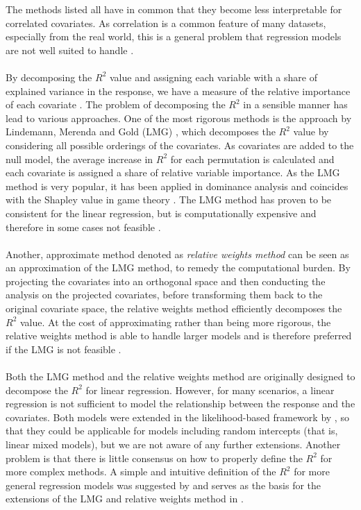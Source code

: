 The methods listed all have in common that they become less interpretable for correlated covariates. As correlation is a common feature of many datasets, especially from the real world, this is a general problem that regression models are not well suited to handle \citep{Gromping_2015}. 
\\
\\
By decomposing the $R^2$ value and assigning each variable with a share of explained variance in the response, we have a measure of the relative importance of each covariate \citep{gromping_relaimpo}. The problem of decomposing the $R^2$ in a sensible manner has lead to various approaches. One of the most rigorous methods is the approach by Lindemann, Merenda and Gold (LMG) \citep{Lindeman1980}, which decomposes the $R^2$ value by considering all possible orderings of the covariates. As covariates are added to the null model, the average increase in $R^2$ for each permutation is calculated and each covariate is assigned a share of relative variable importance. As the LMG method is very popular, it has been applied in dominance analysis \citep{budescu1993dominance} and coincides with the Shapley value in game theory \citep{Shapley1953StochasticG,Lipovetsky_GameTheory}. The LMG method has proven to be consistent for the linear regression, but is computationally expensive and therefore in some cases not feasible \citep{gromping_relaimpo}. 
\\
\\
Another, approximate method denoted as \textit{relative weights method} \citep{johnson_minimization_trace, Fabbris1980, Genizi_relative_weights} can be seen as an approximation of the LMG method, to remedy the computational burden. By projecting the covariates into an orthogonal space and then conducting the analysis on the projected covariates, before transforming them back to the original covariate space, the relative weights method efficiently decomposes the $R^2$ value. At the cost of approximating rather than being more rigorous, the relative weights method is able to handle larger models and is therefore preferred if the LMG is not feasible \citep{gromping_relaimpo}.
\\
\\ 
Both the LMG method and the relative weights method are originally designed to decompose the $R^2$ for linear regression. However, for many scenarios, a linear regression is not sufficient to model the relationship between the response and the covariates. Both models were extended in the likelihood-based framework by \citet{matre}, so that they could be applicable for models including random intercepts (that is, linear mixed models), but we are not aware of any further extensions. Another problem is that there is little consensus on how to properly define the $R^2$ for more complex methods. A simple and intuitive definition of the $R^2$ for more general regression models was suggested by \citet{nakagawa2013general} and serves as the basis for the extensions of the LMG and relative weights method in \citet{matre}. 
